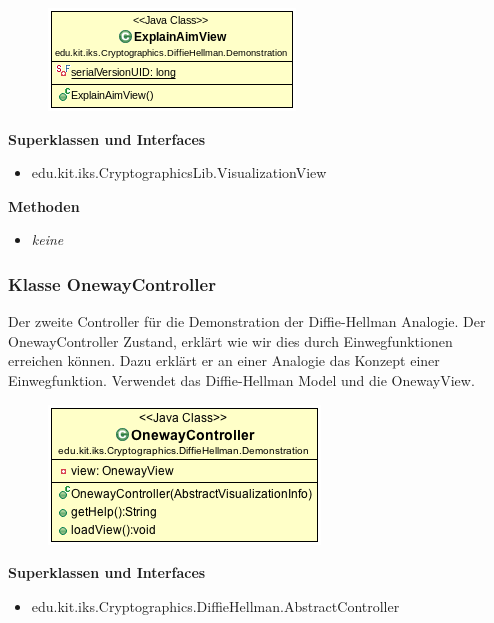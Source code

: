 \documentclass{article}
\begin{document}
      \begin{figure}[H]
        \centering
        \includegraphics{resources/edu-kit-iks-Cryptographics-DiffieHellman-Demonstration-ExplainAimView}
      \end{figure}

      \textbf{Superklassen und Interfaces}
      \begin{itemize}
        \item edu.kit.iks.CryptographicsLib.VisualizationView
      \end{itemize}

      \textbf{Methoden}
      \begin{itemize}
        \item \textit{keine}
      \end{itemize}

\subsubsection{Klasse OnewayController}
      Der zweite Controller für die Demonstration der Diffie-Hellman Analogie.
      Der OnewayController Zustand, erklärt wie wir dies durch Einwegfunktionen
      erreichen können. Dazu erklärt er an einer Analogie das Konzept
      einer Einwegfunktion.
      Verwendet das Diffie-Hellman Model und die OnewayView.

      \begin{figure}[H]
        \centering
        \includegraphics{resources/edu-kit-iks-Cryptographics-DiffieHellman-Demonstration-OnewayController}
      \end{figure}

      \textbf{Superklassen und Interfaces}
      \begin{itemize}
        \item edu.kit.iks.Cryptographics.DiffieHellman.AbstractController
      \end{itemize}
\end{document}
